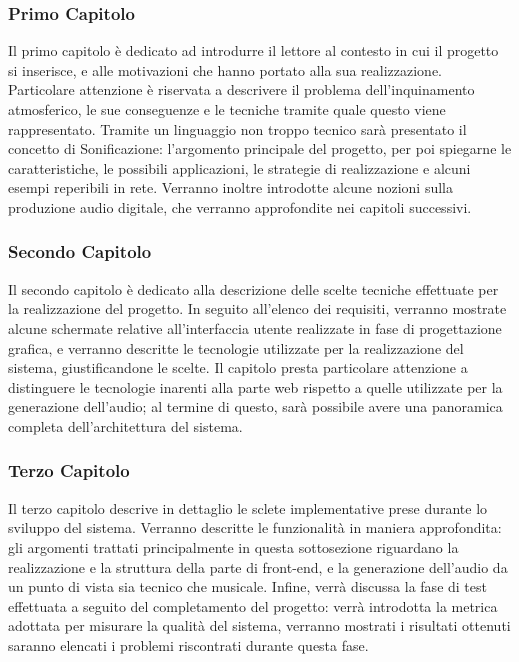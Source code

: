 \subsubsection{Primo Capitolo}
Il primo capitolo è dedicato ad introdurre il lettore al contesto in cui il progetto si inserisce, e alle motivazioni che hanno portato alla sua realizzazione.
Particolare attenzione è riservata a descrivere il problema dell'inquinamento atmosferico, le sue conseguenze e le tecniche tramite quale questo viene rappresentato.
Tramite un linguaggio non troppo tecnico sarà presentato il concetto di Sonificazione: l'argomento principale del progetto, per poi spiegarne le caratteristiche, le possibili applicazioni, le strategie di realizzazione e alcuni esempi reperibili in rete.
Verranno inoltre introdotte alcune nozioni sulla produzione audio digitale, che verranno approfondite nei capitoli successivi.

\subsubsection{Secondo Capitolo}
Il secondo capitolo è dedicato alla descrizione delle scelte tecniche effettuate per la realizzazione del progetto.
In seguito all'elenco dei requisiti, verranno mostrate alcune schermate relative all'interfaccia utente realizzate in fase di progettazione grafica, e verranno descritte le tecnologie utilizzate per la realizzazione del sistema, giustificandone le scelte.
Il capitolo presta particolare attenzione a distinguere le tecnologie inarenti alla parte web rispetto a quelle utilizzate per la generazione dell'audio;
al termine di questo, sarà possibile avere una panoramica completa dell'architettura del sistema.

\subsubsection{Terzo Capitolo}
Il terzo capitolo descrive in dettaglio le sclete implementative prese durante lo sviluppo del sistema.
Verranno descritte le funzionalità in maniera approfondita: gli argomenti trattati principalmente in questa sottosezione riguardano la realizzazione e la struttura della parte di front-end, e la generazione dell'audio da un punto di vista sia tecnico che musicale.
Infine, verrà discussa la fase di test effettuata a seguito del completamento del progetto: verrà introdotta la metrica adottata per misurare la qualità del sistema, verranno mostrati i risultati ottenuti saranno elencati i problemi riscontrati durante questa fase.



\clearpage{\pagestyle{empty}\cleardoublepage}
